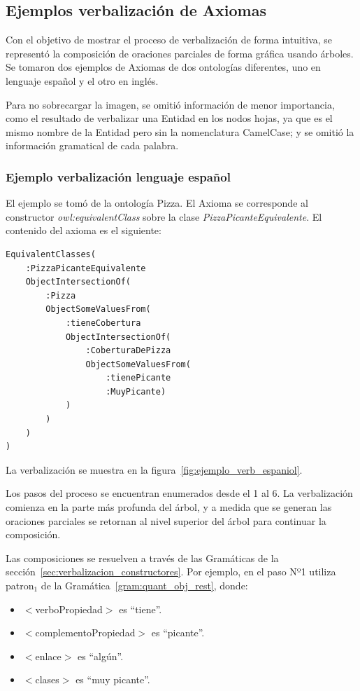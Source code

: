 \subsection{Ejemplos verbalización de Axiomas}
Con el objetivo de mostrar el proceso de verbalización de forma intuitiva, se representó la composición de oraciones parciales de forma gráfica usando árboles. Se tomaron dos ejemplos de Axiomas de dos ontologías diferentes, uno en lenguaje español y el otro en inglés.

Para no sobrecargar la imagen, se omitió información de menor importancia, como el resultado de verbalizar una Entidad en los nodos hojas, ya que es el mismo nombre de la Entidad pero sin la nomenclatura CamelCase; y se omitió la información gramatical de cada palabra.

\subsubsection{Ejemplo verbalización lenguaje español}
El ejemplo se tomó de la ontología Pizza. El Axioma se corresponde al constructor \emph{owl:equivalentClass} sobre la clase \emph{PizzaPicanteEquivalente}. El contenido del axioma es el siguiente: 
\begin{verbatim}
EquivalentClasses(
    :PizzaPicanteEquivalente
    ObjectIntersectionOf(
        :Pizza
        ObjectSomeValuesFrom(
            :tieneCobertura
            ObjectIntersectionOf(
                :CoberturaDePizza
                ObjectSomeValuesFrom(
                    :tienePicante
                    :MuyPicante)
            )
        )
    )
)    
\end{verbatim}
La verbalización se muestra en la figura~\ref{fig:ejemplo_verb_espaniol}.

Los pasos del proceso se encuentran enumerados desde el 1 al 6. La verbalización comienza en la parte más profunda del árbol, y a medida que se generan las oraciones parciales se retornan al nivel superior del árbol para continuar la composición.

Las composiciones se resuelven a través de las Gramáticas de la sección~\ref{sec:verbalizacion_constructores}. Por ejemplo, en el paso Nº1 utiliza patron$_1$ de la Gramática~\ref{gram:quant_obj_rest}, donde:
\begin{itemize}
    \item $<$verboPropiedad$>$ es ``tiene''.
    \item $<$complementoPropiedad$>$ es ``picante''.
    \item $<$enlace$>$ es ``algún''.
    \item $<$clases$>$ es ``muy picante''.
\end{itemize}

